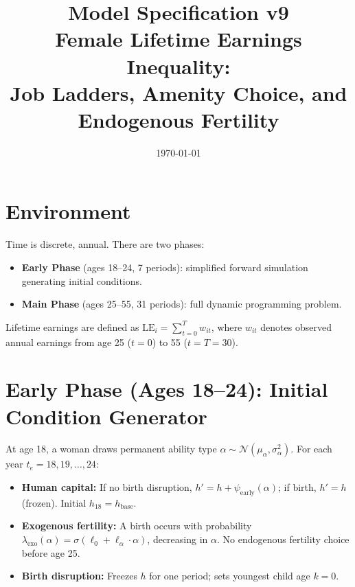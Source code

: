 \documentclass[11pt]{article}
\title{\textbf{Model Specification v9} \\ Female Lifetime Earnings Inequality: \\ Job Ladders, Amenity Choice, and Endogenous Fertility}
\author{}
\date{\today}
\newcommand{\LE}{\mathrm{LE}}
\begin{document}
\maketitle

\section{Environment}

Time is discrete, annual. There are two phases:
\begin{itemize}[nosep]
  \item \textbf{Early Phase} (ages 18--24, 7 periods): simplified forward simulation generating initial conditions.
  \item \textbf{Main Phase} (ages 25--55, 31 periods): full dynamic programming problem.
\end{itemize}
Lifetime earnings are defined as $\LE_i = \sum_{t=0}^{T} w_{it}$, where $w_{it}$ denotes observed annual earnings from age 25 ($t=0$) to 55 ($t=T=30$).

\section{Early Phase (Ages 18--24): Initial Condition Generator}

At age 18, a woman draws permanent ability type $\alpha \sim \mathcal{N}(\mu_\alpha, \sigma_\alpha^2)$. For each year $t_e = 18, 19, \ldots, 24$:

\begin{itemize}[nosep]
  \item \textbf{Human capital:} If no birth disruption, $h' = h + \psi_{\text{early}}(\alpha)$; if birth, $h' = h$ (frozen). Initial $h_{18} = h_{\text{base}}$.
  \item \textbf{Exogenous fertility:} A birth occurs with probability $\lambda_{\text{exo}}(\alpha) = \sigma(\ell_0 + \ell_\alpha \cdot \alpha)$, decreasing in $\alpha$. No endogenous fertility choice before age 25.
  \item \textbf{Birth disruption:} Freezes $h$ for one period; sets youngest child age $k = 0$.
\end{itemize}
\end{document}
